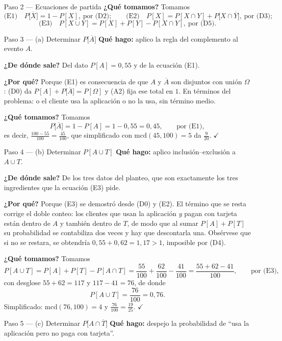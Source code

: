 \documentclass[11pt]{article}
\begin{document}
\begin{sol}
\begin{paso}{Paso 2 --- Ecuaciones de partida}
\textbf{¿Qué tomamos?} Tomamos
\[
\text{(E1)}\quad P\big[\overline{X}\big]=1-P[X],\ \text{por (D2)};
\qquad
\text{(E2)}\quad P[X]=P[X\cap Y]+P\big[X\cap\overline{Y}\big],\ \text{por (D3)};
\]
\[
\text{(E3)}\quad P[X\cup Y]=P[X]+P[Y]-P[X\cap Y],\ \text{por (D5)}.
\]
\end{paso}

\begin{paso}{Paso 3 --- (a) Determinar $P\big[\overline{A}\big]$}
\textbf{Qué hago:} aplico la regla del complemento al evento $A$.

\textbf{¿De dónde sale?} Del dato $P[A]=0{,}55$ y de la ecuación (E1).

\textbf{¿Por qué?} Porque (E1) es consecuencia de que $A$ y $\overline{A}$ son disjuntos con
unión $\Omega$: (D0) da $P[A]+P\big[\overline{A}\big]=P[\Omega]$ y (A2) fija ese total en $1$. En
términos del problema: o el cliente usa la aplicación o no la usa, sin término medio.

\textbf{¿Qué tomamos?} Tomamos
\[
P\big[\overline{A}\big]=1-P[A]=1-0{,}55=0{,}45 , \qquad\text{por (E1)} ,
\]
es decir, $\frac{100-55}{100}=\frac{45}{100}$, que simplificado con $\mathrm{mcd}(45,100)=5$ da
$\frac{9}{20}$. $\checkmark$
\end{paso}

\begin{paso}{Paso 4 --- (b) Determinar $P[A\cup T]$}
\textbf{Qué hago:} aplico inclusión--exclusión a $A\cup T$.

\textbf{¿De dónde sale?} De los tres datos del planteo, que son exactamente los tres
ingredientes que la ecuación (E3) pide.

\textbf{¿Por qué?} Porque (E3) se demostró desde (D0) y (E2). El término que se resta corrige el
doble conteo: los clientes que usan la aplicación \emph{y} pagan con tarjeta están dentro de $A$
y también dentro de $T$, de modo que al sumar $P[A]+P[T]$ su probabilidad se contabiliza dos
veces y hay que descontarla una. Obsérvese que si no se restara, se obtendría
$0{,}55+0{,}62=1{,}17>1$, imposible por (D4).

\textbf{¿Qué tomamos?} Tomamos
\[
P[A\cup T]=P[A]+P[T]-P[A\cap T]
=\frac{55}{100}+\frac{62}{100}-\frac{41}{100}=\frac{55+62-41}{100} , \qquad\text{por (E3),}
\]
con desglose $55+62=117$ y $117-41=76$, de donde
\[
P[A\cup T]=\frac{76}{100}=0{,}76 .
\]
Simplificado: $\mathrm{mcd}(76,100)=4$ y $\frac{76}{100}=\frac{19}{25}$. $\checkmark$
\end{paso}

\begin{paso}{Paso 5 --- (c) Determinar $P\big[A\cap\overline{T}\big]$}
\textbf{Qué hago:} despejo la probabilidad de ``usa la aplicación pero no paga con tarjeta''.


\end{paso}
\end{sol}
\end{document}

